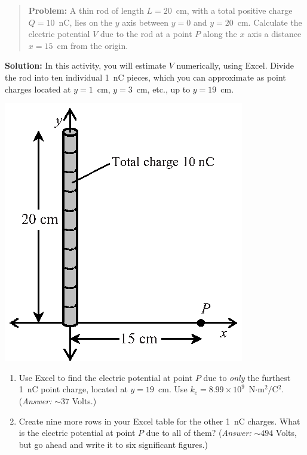 \begin{minipage}{0.64\textwidth}
\begin{quote}
\textbf{Problem:} A thin rod of length $L=20$~cm, with a total positive charge $Q=10$~nC, lies on the $y$ axis between $y=0$ and $y=20$~cm.  Calculate the electric potential $V$ due to the rod at a point $P$ along the $x$ axis a distance $x=15$~cm from the origin. 
\end{quote}

\textbf{Solution:} In this activity, you will estimate $V$ numerically, using Excel.  Divide the rod into ten individual 1~nC pieces, which you can approximate as point charges located at $y=1$~cm, $y=3$~cm, etc., up to $y=19$~cm.  
\end{minipage}
\begin{minipage}{0.35\textwidth}
\vspace{-0.3in}
\raggedleft \includegraphics[scale=0.9]{potential_charge_distributions/rod_axes.eps}
\end{minipage}

\begin{enumerate}[labparts]

\item Use Excel to find the electric potential at point $P$ due to \textit{only} the furthest 1~nC point charge, located at $y=19$~cm.  Use $k_e=8.99 \times 10^9$~N$\cdot$m$^2/$C$^2$.  (\textit{Answer:} $\sim 37$ Volts.)
\answerspace{0.5in}

\item Create nine more rows in your Excel table for the other 1~nC charges.  What is the electric potential at point $P$ due to all of them?  (\textit{Answer:} $\sim 494$ Volts, but go ahead and write it to six significant figures.) 
\answerspace{0.5in}

\end{enumerate}

